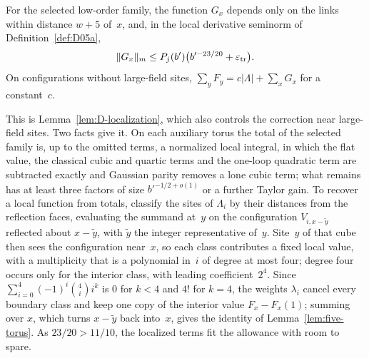 \begin{lemma}\label{lem:five-torus}
For the selected low-order family, the function $G_x$ depends only on the links within distance $w+5$ of~$x$, and, in the local derivative seminorm of Definition~\ref{def:D05a},
\begin{equation*}
\|G_x\|_m\le P_j(b')\bigl(b'^{-23/20}+\varepsilon_{\rm tr}\bigr).
\end{equation*}
On configurations without large-field sites, $\sum_yF_y=c|\Lambda|+\sum_xG_x$ for a constant~$c$.
\end{lemma}

This is Lemma~\ref{lem:D-localization}, which also controls the correction near large-field sites. Two facts give it. On each auxiliary torus the total of the selected family is, up to the omitted terms, a normalized local integral, in which the flat value, the classical cubic and quartic terms and the one-loop quadratic term are subtracted exactly and Gaussian parity removes a lone cubic term; what remains has at least three factors of size $b'^{-1/2+o(1)}$ or a further Taylor gain. To recover a local function from totals, classify the sites of $\Lambda_i$ by their distances from the reflection faces, evaluating the summand at~$y$ on the configuration $V_{i,x-\tilde y}$ reflected about $x-\tilde y$, with $\tilde y$ the integer representative of~$y$. Site~$y$ of that cube then sees the configuration near~$x$, so each class contributes a fixed local value, with a multiplicity that is a polynomial in~$i$ of degree at most four; degree four occurs only for the interior class, with leading coefficient~$2^4$. Since $\sum_{i=0}^4(-1)^i\binom4ii^k$ is $0$ for $k<4$ and $4!$ for $k=4$, the weights $\lambda_i$ cancel every boundary class and keep one copy of the interior value $F_x-F_x(1)$; summing over $x$, which turns $x-\tilde y$ back into~$x$, gives the identity of Lemma~\ref{lem:five-torus}. As $23/20>11/10$, the localized terms fit the allowance with room to spare.

